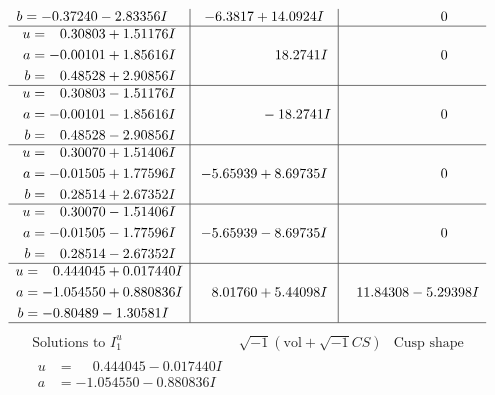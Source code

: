 \documentclass[1p]{elsarticle_modified}
\theoremstyle{definition}
\newcommand{\I}{\sqrt{-1}}
\begin{document}
$$\begin{array}{c|c|c}
\begin{aligned}
b &= -0.37240 - 2.83356 I\end{aligned}
 & -6.3817 + 14.0924 I & \phantom{-0.000000 } 0 \\ \hline\begin{aligned}
u &= \phantom{-}0.30803 + 1.51176 I \\
a &= -0.00101 + 1.85616 I \\
b &= \phantom{-}0.48528 + 2.90856 I\end{aligned}
 & \phantom{-0.000000 -}18.2741 I & \phantom{-0.000000 } 0 \\ \hline\begin{aligned}
u &= \phantom{-}0.30803 - 1.51176 I \\
a &= -0.00101 - 1.85616 I \\
b &= \phantom{-}0.48528 - 2.90856 I\end{aligned}
 & \phantom{-0.000000 } -18.2741 I & \phantom{-0.000000 } 0 \\ \hline\begin{aligned}
u &= \phantom{-}0.30070 + 1.51406 I \\
a &= -0.01505 + 1.77596 I \\
b &= \phantom{-}0.28514 + 2.67352 I\end{aligned}
 & -5.65939 + 8.69735 I & \phantom{-0.000000 } 0 \\ \hline\begin{aligned}
u &= \phantom{-}0.30070 - 1.51406 I \\
a &= -0.01505 - 1.77596 I \\
b &= \phantom{-}0.28514 - 2.67352 I\end{aligned}
 & -5.65939 - 8.69735 I & \phantom{-0.000000 } 0 \\ \hline\begin{aligned}
u &= \phantom{-}0.444045 + 0.017440 I \\
a &= -1.054550 + 0.880836 I \\
b &= -0.80489 - 1.30581 I\end{aligned}
 & \phantom{-}8.01760 + 5.44098 I & \phantom{-}11.84308 - 5.29398 I\\
 \hline 
 \end{array}$$\newpage$$\begin{array}{c|c|c}  
\text{Solutions to }I^u_{1}& \I (\text{vol} + \sqrt{-1}CS) & \text{Cusp shape}\\
 \hline 
\begin{aligned}
u &= \phantom{-}0.444045 - 0.017440 I \\
a &= -1.054550 - 0.880836 I \\

\end{aligned}
\end{array}$$
\end{document}

